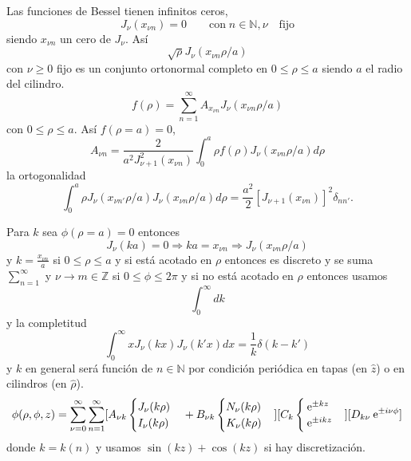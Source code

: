 \documentclass[10pt,oneside]{CBFT_book}
\begin{document}
Las funciones de Bessel tienen infinitos ceros,
\[
	J_\nu(x_{\nu n}) = 0 \qquad \mathrm{con} \; n\in\mathbb{N}, \nu \quad \mathrm{fijo} 
\]
siendo $x_{\nu n}$ un cero de $J_\nu$. Así
\[
	\sqrt{\rho} J_\nu(x_{\nu n} \rho/a) 
\]
con $\nu \geq 0$ fijo es un conjunto ortonormal completo en $0 \leq \rho \leq a$ siendo $a$ el radio del 
cilindro.
\[
	f(\rho) = \sum_{n=1}^{\infty}  A_{x_{\nu n}} J_{\nu}( x_{\nu n} \rho/a )
\]
con $0 \leq \rho \leq a$. Así $f(\rho=a)=0$,
\[
	A_{\nu n} = \frac{2}{a^2 J_{\nu +1}^2 (x_{\nu n})} \int_0^a \rho f(\rho) J_\nu (x_{\nu n} \rho/a) 
	d\rho
\]
la ortogonalidad
\[
	\int_0^a \rho  J_\nu (x_{\nu n'} \rho/a)  J_\nu (x_{\nu n} \rho/a)  d\rho = 
	\frac{a^2}{2}[J_{\nu+1}(x_{\nu n})]^2 \delta_{nn'}.
\]

Para $k$ sea $\phi(\rho=a)=0$ entonces 
\[
	J_\nu(ka) = 0 \Rightarrow ka=x_{\nu n} \Rightarrow J_\nu (x_{\nu n} \rho/a)
\]
y $k=\frac{x_{\nu n}}{a}$ si $0\leq \rho \leq a$ y si está acotado en $\rho$ entonces es discreto y se
suma $\sum_{n=1}^\infty$ y $\nu\to m \in \mathbb{Z}$ si $0 \leq \phi \leq 2\pi$ y si no está acotado en
$\rho$ entonces usamos 
\[
	\int_0^\infty dk
\]
y la completitud
\[
	\int_0^\infty x J_\nu(kx) J_\nu(k'x) dx = \frac{1}{k} \delta (k-k')
\]
y $k$ en general será función de $n\in \mathbb{N}$ por condición periódica en tapas (en $\hat{z}$) o en
cilindros (en $\hat{\rho}$).
\[
	\phi(\rho,\phi,z) = \sum_{\nu=0}^\infty \sum_{n=1}^\infty
	[A_{\nu k}\begin{cases} J_\nu(k\rho)  \\ I_\nu(k\rho) \end{cases} + 
	B_{\nu k} \begin{cases} N_\nu(k\rho)  \\ K_\nu(k\rho) \end{cases} ]
	[C_k \begin{cases} \:\mathrm{e}^{\pm kz} \\ \:\mathrm{e}^{\pm ikz} \end{cases}]
	[D_{k\nu} \:\mathrm{e}^{\pm i \nu \phi}]
\]
donde $k=k(n)$ y usamos $\sin(kz)+\cos(kz)$ si hay discretización.



\end{document}
